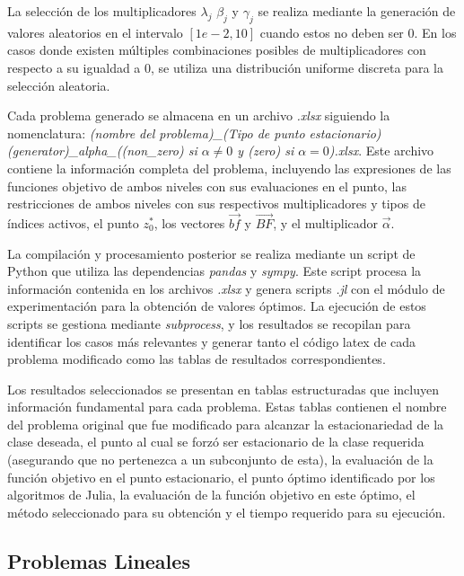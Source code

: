     La selección de los multiplicadores $\lambda_j$ $\beta_j$ y $\gamma_j$ se realiza mediante la generación de valores aleatorios en el intervalo $[1e-2, 10]$ cuando estos no deben ser $0$. En los casos donde existen múltiples combinaciones posibles de multiplicadores con respecto a su igualdad a $0$, se utiliza una distribución uniforme discreta para la selección aleatoria.
    
    Cada problema generado se almacena en un archivo \textit{.xlsx} siguiendo la nomenclatura: \textit{(nombre del problema)\_(Tipo de punto estacionario)(generator)\_alpha\_((non\_zero) si $\alpha \neq 0$ y (zero) si $\alpha = 0$).xlsx}. Este archivo contiene la información completa del problema, incluyendo las expresiones de las funciones objetivo de ambos niveles con sus evaluaciones en el punto, las restricciones de ambos niveles con sus respectivos multiplicadores y tipos de índices activos, el punto $z^*_0$, los vectores $\vec{bf}$ y $\vec{BF}$, y el multiplicador $\vec{\alpha}$.
    
    La compilación y procesamiento posterior se realiza mediante un script de Python que utiliza las dependencias \textit{pandas} y \textit{sympy}. Este script procesa la información contenida en los archivos \textit{.xlsx} y genera scripts \textit{.jl} con el módulo de experimentación para la obtención de valores óptimos. La ejecución de estos scripts se gestiona mediante \textit{subprocess}, y los resultados se recopilan para identificar los casos más relevantes y generar tanto el código latex de cada problema modificado como las tablas de resultados correspondientes.
    
    
    
    Los resultados seleccionados se presentan en tablas estructuradas que incluyen información fundamental para cada problema. Estas tablas contienen el nombre del problema original que fue modificado para alcanzar la estacionariedad de la clase deseada, el punto al cual se forzó ser estacionario de la clase requerida (asegurando que no pertenezca a un subconjunto de esta), la evaluación de la función objetivo en el punto estacionario, el punto óptimo identificado por los algoritmos de Julia, la evaluación de la función objetivo en este óptimo, el método seleccionado para su obtención y el tiempo requerido para su ejecución.

\subsection{Problemas Lineales} 
  
